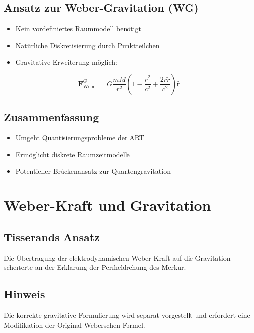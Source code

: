 \subsection{Ansatz zur Weber-Gravitation (WG)}
\begin{itemize}[leftmargin=*,noitemsep]
    \item Kein vordefiniertes Raummodell benötigt
    \item Natürliche Diskretisierung durch Punktteilchen
    \item Gravitative Erweiterung möglich:
\end{itemize}

\begin{equation}
\bm{F}_{\text{Weber}}^{G} = G\frac{mM}{r^2}\left(1 - \frac{\dot{r}^2}{c^2} + \frac{2r\ddot{r}}{c^2}\right)\bm{\hat{r}}
\end{equation}

\subsection*{Zusammenfassung}
\begin{itemize}[leftmargin=*,noitemsep]
    \item Umgeht Quantisierungsprobleme der ART
    \item Ermöglicht diskrete Raumzeitmodelle
    \item Potentieller Brückenansatz zur Quantengravitation
\end{itemize}

\section{Weber-Kraft und Gravitation}

\subsection*{Tisserands Ansatz}
Die Übertragung der elektrodynamischen Weber-Kraft auf die Gravitation scheiterte an der Erklärung der Periheldrehung des Merkur.

\subsection*{Hinweis}
Die korrekte gravitative Formulierung wird separat vorgestellt und erfordert eine Modifikation der Original-Weberschen Formel.
